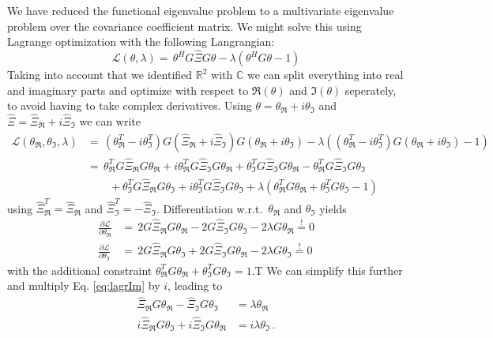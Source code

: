 We have reduced the functional eigenvalue problem to a multivariate eigenvalue problem over the covariance coefficient matrix.
We might solve this using Lagrange optimization with the following Langrangian:
\begin{equation}
  \mathcal{L}(\theta,\lambda) = \, \theta^H G \hat{\Xi} G \theta - \lambda ( \theta^H G \theta - 1)
\end{equation}
Taking into account that we identified $\mathbb{R}^2$ with $\mathbb{C}$ we can split everything into real and imaginary parts and optimize with respect to $\Re(\theta)$ and $\Im(\theta)$ seperately, to avoid having to take complex derivatives.
Using $\theta = \theta_\Re + i \theta_\Im$ and $\hat{\Xi} = \hat\Xi_\Re + i \hat\Xi_\Im$ we can write
\begin{align*}
  \mathcal{L}(\theta_\Re,\theta_\Im,\lambda) & = \, 
    (\theta_\Re^T - i \theta_\Im^T) G ( \hat{\Xi}_\Re + i \hat\Xi_\Im ) G ( \theta_\Re + i \theta_\Im )
    - \lambda \left( (\theta_\Re^T - i \theta_\Im^T ) G (\theta_\Re + i \theta_\Im) - 1 \right) \\
  & = \, \theta_\Re^T G \hat\Xi_\Re G \theta_\Re 
    + i \theta_\Re^T G \hat\Xi_\Im G \theta_\Re 
    + \theta_\Im^T G \hat\Xi_\Im G \theta_\Re
    - \theta_\Re^T G \hat\Xi_\Im G \theta_\Im \\
  & \qquad  + \theta_\Im^T G \hat\Xi_\Re G \theta_\Im
    + i \theta_\Im^T G \hat\Xi_\Im G \theta_\Im 
    + \lambda \left( \theta_\Re^T G \theta_\Re + \theta_\Im^T G \theta_\Im - 1 \right)
\end{align*}
using $\hat\Xi_\Re^T = \hat\Xi_\Re$ and $\hat\Xi_\Im^T = - \hat\Xi_\Im$.
Differentiation w.r.t.\ $\theta_\Re$ and $\theta_\Im$ yields
\begin{align}
  \frac{\partial \mathcal{L}}{\partial \theta_\Re} & = \, 
    2G\hat\Xi_\Re G \theta_\Re - 2G\hat\Xi_\Im G \theta_\Im - 2\lambda G\theta_\Re \overset{!}{=} 0 \label{eq:lagrRe}\\
  \frac{\partial \mathcal{L}}{\partial \theta_\Im} & = \,
    2G\hat\Xi_\Re G \theta_\Im + 2G\hat\Xi_\Im G \theta_\Re - 2\lambda G\theta_\Im \overset{!}{=} 0 \label{eq:lagrIm}
\end{align}
with the additional constraint $\theta_\Re^T G \theta_\Re + \theta_\Im^T G \theta_\Im = 1$.T
We can simplify this further and multiply Eq. \ref{eq:lagrIm} by $i$, leading to
\begin{align}
  \hat\Xi_\Re G \theta_\Re - \hat\Xi_\Im G \theta_\Im & = \lambda \theta_\Re\\
  i \hat\Xi_\Re G \theta_\Im + i \hat\Xi_\Im G \theta_\Re & = i \lambda \theta_\Im \,.
\end{align}
